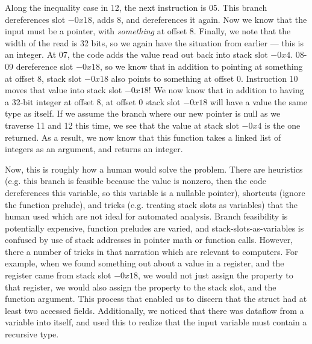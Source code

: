 Along the inequality case in 12, the next instruction is 05. This branch dereferences slot $-0x18$, adds 8, and dereferences it again. Now we know that the input must be a pointer, with \emph{something} at offset 8. Finally, we note that the width of the read is 32 bits, so we again have the situation from earlier --- this is an integer. At 07, the code adds the value read out back into stack slot $-0x4$. 08-09 dereference slot $-0x18$, so we know that in addition to pointing at something at offset 8, stack slot $-0x18$ also points to something at offset 0. Instruction 10 moves that value into stack slot $-0x18$! We now know that in addition to having a 32-bit integer at offset 8, at offset 0 stack slot $-0x18$ will have a value the same type as itself. If we assume the branch where our new pointer is null as we traverse 11 and 12 this time, we see that the value at stack slot $-0x4$ is the one returned. As a result, we now know that this function takes a linked list of integers as an argument, and returns an integer.

Now, this is roughly how a human would solve the problem. There are heuristics (e.g. this branch is feasible because the value is nonzero, then the code dereferences this variable, so this variable is a nullable pointer), shortcuts (ignore the function prelude), and tricks (e.g. treating stack slots as variables) that the human used which are not ideal for automated analysis. Branch feasibility is potentially expensive, function preludes are varied, and stack-slots-as-variables is confused by use of stack addresses in pointer math or function calls. However, there a number of tricks in that narration which are relevant to computers. For example, when we found something out about a value in a register, and the register came from stack slot $-0x18$, we would not just assign the property to that register, we would also assign the property to the stack slot, and the function argument. This process that enabled us to discern that the struct had at least two accessed fields. Additionally, we noticed that there was dataflow from a variable into itself, and used this to realize that the input variable must contain a recursive type.


